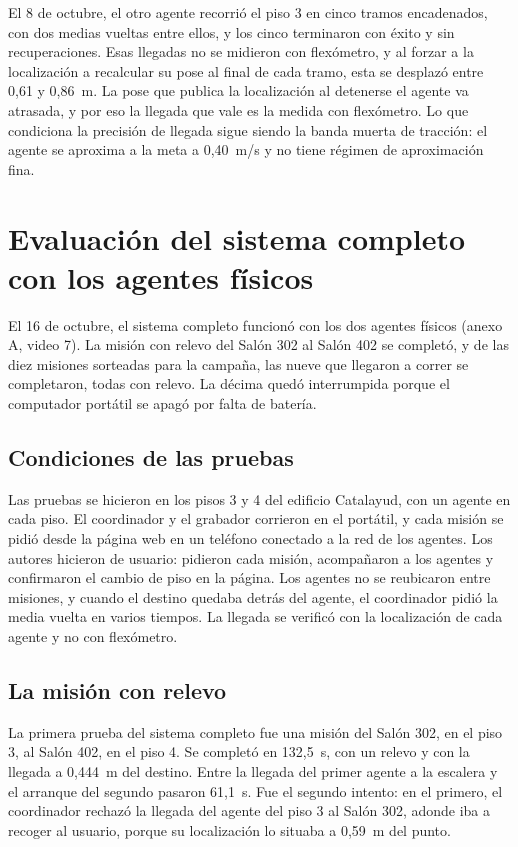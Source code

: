 El 8 de octubre, el otro agente recorrió el piso 3 en cinco tramos
encadenados, con dos medias vueltas entre ellos, y los cinco terminaron con éxito
y sin recuperaciones. Esas llegadas no se midieron con flexómetro, y al forzar a la
localización a recalcular su pose al final de cada tramo, esta se desplazó entre 0,61 y 0,86~m. La pose que publica la localización al detenerse el agente va atrasada, y por eso la llegada que vale es la medida con flexómetro. Lo que condiciona la precisión de llegada sigue siendo la banda muerta de tracción: el agente se aproxima a la
meta a 0,40~m/s y no tiene régimen de aproximación fina.

\section{Evaluación del sistema completo con los agentes físicos}
\label{sec:res-completo}

El 16 de octubre, el sistema completo funcionó con los dos agentes físicos (anexo A, video 7). La misión con relevo del
Salón 302 al Salón 402 se completó, y de las diez misiones sorteadas para la
campaña, las nueve que llegaron a correr se completaron, todas con relevo. La
décima quedó interrumpida porque el computador portátil se apagó por falta de
batería.

\subsection{Condiciones de las pruebas}

Las pruebas se hicieron en los pisos 3 y 4 del edificio Catalayud, con un agente en cada piso. El
coordinador y el grabador corrieron en el portátil, y cada misión se pidió desde
la página web en un teléfono conectado a la red de los agentes. Los autores
hicieron de usuario: pidieron cada misión, acompañaron a los agentes y
confirmaron el cambio de piso en la página. Los agentes no se reubicaron entre
misiones, y cuando el destino quedaba detrás del agente, el coordinador pidió la media vuelta en varios tiempos. La llegada se verificó con la localización de cada agente y no con flexómetro.

\subsection{La misión con relevo}

La primera prueba del sistema completo fue una misión del Salón 302, en el piso 3,
al Salón 402, en el piso 4. Se completó en 132,5~s, con un relevo y con la llegada
a 0,444~m del destino. Entre la llegada del primer agente a la escalera y el
arranque del segundo pasaron 61,1~s. Fue el segundo intento: en el primero, el
coordinador rechazó la llegada del agente del piso 3 al Salón 302, adonde iba a
recoger al usuario, porque su localización lo situaba a 0,59~m del punto.

